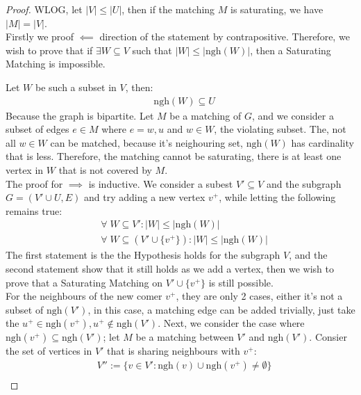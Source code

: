 \documentclass[]{article}
\theoremstyle{definition}
\begin{document}
    \begin{proof}
        WLOG, let $|V|\le |U|$, then if the matching $M$ is saturating, we have $|M| = |V|$. 
        \\[1.1em]
        Firstly we proof $\impliedby$ direction of the statement by contrapositive. Therefore, we wish to prove that if $\exists W\subseteq V$ such that $|W| \le |\text{ngh}(W)|$, then a Saturating Matching is impossible. 
        \par
        Let $W$ be such a subset in $V$, then: 
        \begin{align}
            & \text{ngh}(W)\subseteq U
        \end{align}
        Because the graph is bipartite. Let $M$ be a matching of $G$, and we consider a subset of edges $e\in M$ where $e = {w, u}$ and $w \in W$, the violating subset. The, not all $w \in W$ can be matched, because it's neighouring set, $\text{ngh}(W)$ has cardinality that is less. Therefore, the matching cannot be saturating, there is at least one vertex in $W$ that is not covered by $M$. 
        \\[1.1em]
        The proof for $\implies$ is inductive. We consider a subest $V'\subseteq V$ and the subgraph $G=(V'\cup U, E)$ and try adding a new vertex $v^+$, while letting the following remains true: 
        \begin{align}
            & \forall\; W\subseteq V': |W| \le |\text{ngh}(W)|
            \\
            & \forall\;  W\subseteq (V'\cup \{v^+\}): |W| \le |\text{ngh}(W)|
        \end{align}
        The first statement is the the Hypothesis holds for the subgraph $V$, and the second statement show that it still holds as we add a vertex, then we wish to prove that a Saturating Matching on $V'\cup \{v^+\}$ is still possible. 
        \\[1.1em]
        For the neighbours of the new comer $v^+$, they are only 2 cases, either it's not a subset of $\text{ngh}(V')$, in this case, a matching edge can be added trivially, just take the $u^+\in \text{ngh}(v^+), u^+\not\in\text{ngh}(V')$. Next, we consider the case where $\text{ngh}(v^+)\subseteq \text{ngh}(V')$; let $M$ be a matching between $V'$ and $\text{ngh}(V')$. Consier the set of vertices in $V'$ that is sharing neighbours with $v^+$: 
        \begin{align}
            & V'' := \{v\in V': \text{ngh}(v)\cup \text{ngh}(v^+)\neq \emptyset\}
            \\

\end{align}
\end{proof}
\end{document}
